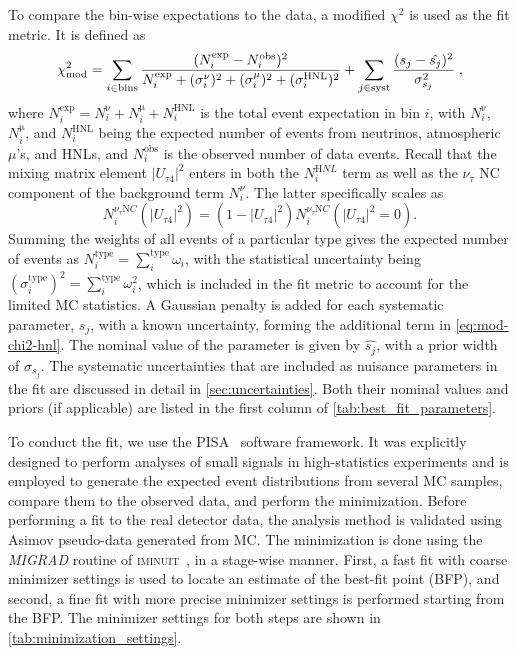 \documentclass[
    aps,
    prd,
    reprint,
    amsmath,
    amssymb,
    nofootinbib,
    superscriptaddress,
    floatfix
]{revtex4-2}
\renewcommand{\rm}{\mathrm}
\newcommand{\rm}{\mathrm}
\begin{document}
To compare the bin-wise expectations to the data, a modified $\chi^2$ is used as the fit metric. It is defined as
\begin{equation}
    \footnotesize
    \chi^2_{\mathrm{mod}} =
    \sum_{i \in \mathrm{bins}}^{}\frac{(N^{\rm{exp}}_i - N^{\mathrm{obs}}_i)^2}
    {N^{\rm{exp}}_i + (\sigma^{\mathrm{\nu}}_i)^2 + (\sigma^{\mathrm{\mu}}_i)^2 + (\sigma^{\mathrm{HNL}}_i)^2}
    + \sum_{j \in \mathrm{syst}}^{}\frac{(s_j - \hat{s_j})^2}{\sigma^2_{s_j}}
    \;,
    \label{eq:mod-chi2-hnl}
\end{equation}
where $N^{\rm{exp}}_i = N^{\mathrm{\nu}}_i + N^{\mathrm{\mu}}_i + N^{\mathrm{HNL}}_i$ is the total event expectation in bin $i$, with $N^{\mathrm{\nu}}_i$, $N^{\mathrm{\mu}}_i$, and $N^{\mathrm{HNL}}_i$ being the expected number of events from neutrinos, atmospheric $\mu$'s, and HNLs, and $N^{\mathrm{obs}}_i$ is the observed number of data events.
Recall that the mixing matrix element $|U_{\tau 4}|^2$ enters in both the $N_i^{\rm HNL}$ term as well as the $\nu_\tau$ NC component of the background term $N_i^\nu$.
The latter specifically scales as
\begin{equation}
    N_i^{\nu_\tau{\rm NC}}(|U_{\tau 4}|^2) = (1 - |U_{\tau 4}|^2) N_i^{\nu_\tau{\rm NC}}(|U_{\tau 4}|^2 = 0).
\end{equation}
Summing the weights of all events of a particular type gives the expected number of events as $N^{\mathrm{type}}_i = \sum_i^\rm{type}\omega_i$, with the statistical uncertainty being $(\sigma^{\mathrm{type}}_i)^2 = \sum_i^\rm{type}\omega_i^2$, which is included in the fit metric to account for the limited MC statistics. A Gaussian penalty is added for each systematic parameter, $s_j$, with a known uncertainty, forming the additional term in \cref{eq:mod-chi2-hnl}. The nominal value of the parameter is given by $\hat{s_j}$, with a prior width of $\sigma_{s_j}$. The systematic uncertainties that are included as nuisance parameters in the fit are discussed in detail in \cref{sec:uncertainties}. Both their nominal values and priors (if applicable) are listed in the first column of \cref{tab:best_fit_parameters}.

To conduct the fit, we use the \textsc{PISA}~\cite{pisa_paper, pisa_software} software framework.
It was explicitly designed to perform analyses of small signals in high-statistics experiments and is employed to generate the expected event distributions from several MC samples, compare them to the observed data, and perform the minimization.
Before performing a fit to the real detector data, the analysis method is validated using Asimov pseudo-data generated from MC.
The minimization is done using the \textit{MIGRAD} routine of \textsc{iminuit}~\cite{iminuit_v2.17.0}, in  a stage-wise manner.
First, a fast fit with coarse minimizer settings is used to locate an estimate of the best-fit point (BFP), and second, a fine fit with more precise minimizer settings is performed starting from the BFP. The minimizer settings for both steps are shown in \cref{tab:minimization_settings}.
\end{document}
